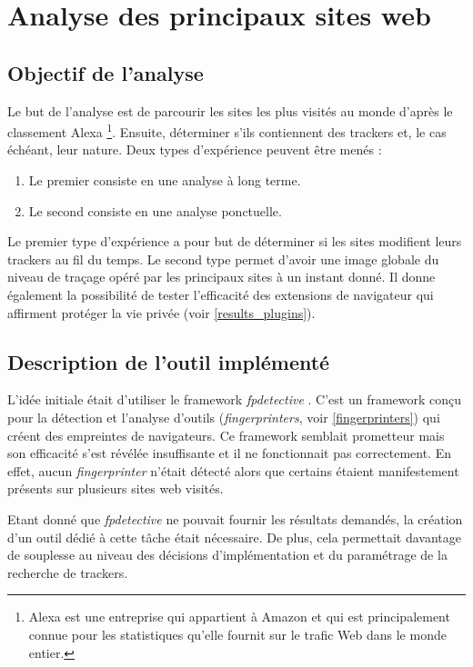 \chapter{Analyse des principaux sites web}
\section{Objectif de l'analyse}
Le but de l'analyse est de parcourir les sites les plus visités au monde d'après le classement Alexa \footnote{Alexa \cite{AlexaTop} est une entreprise qui appartient à Amazon et qui est principalement connue pour les statistiques qu'elle fournit sur le trafic Web dans le monde entier.}. Ensuite, déterminer s'ils contiennent des trackers et, le cas échéant, leur nature. Deux types d'expérience peuvent être menés :
\begin{enumerate}
	\item Le premier consiste en une analyse à long terme.
	\item Le second consiste en une analyse ponctuelle.
\end{enumerate}

Le premier type d'expérience a pour but de déterminer si les sites modifient leurs trackers au fil du temps.
Le second type permet d'avoir une image globale du niveau de traçage opéré par les principaux sites à un instant donné. Il donne également la possibilité de tester l'efficacité des extensions de navigateur qui affirment protéger la vie privée (voir \autoref{results_plugins}).

\section{Description de l'outil implémenté}
L'idée initiale était d'utiliser le framework \textit{fpdetective} \cite{Acar:2013:FDW:2508859.2516674}. C'est un framework conçu pour la détection et l'analyse d'outils (\textit{fingerprinters}, voir \autoref{fingerprinters}) qui créent des empreintes de navigateurs. Ce framework semblait prometteur mais son efficacité s'est révélée insuffisante et il ne fonctionnait pas correctement. En effet, aucun \textit{fingerprinter} n'était détecté alors que certains étaient manifestement présents sur plusieurs sites web visités.

Etant donné que \textit{fpdetective} ne pouvait fournir les résultats demandés, la création d'un outil dédié à cette tâche était nécessaire. De plus, cela permettait davantage de souplesse au niveau des décisions d'implémentation et du paramétrage de la recherche de trackers.
\newline

